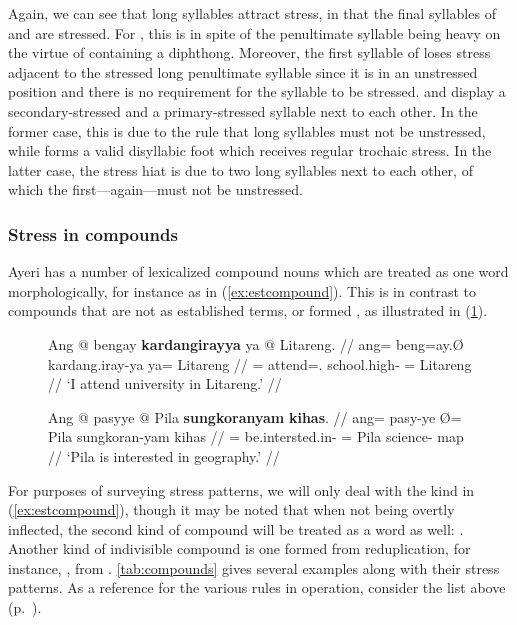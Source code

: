 Again, we can see that long syllables attract stress, in that the final
syllables of  and  are
stressed. For , this is in spite of the penultimate
syllable being heavy on the virtue of containing a diphthong. Moreover, the
first syllable of  loses stress adjacent to the
stressed long penultimate syllable since it is in an unstressed position and
there is no requirement for the syllable to be stressed. 
and  display a secondary-stressed and a
primary-stressed syllable next to each other. In the former case, this is due
to the rule that long syllables must not be unstressed, while 
forms a valid disyllabic foot which receives regular trochaic stress. In the
latter case, the stress hiat is due to two long syllables next to each other,
of which the first---again---must not be unstressed.


\subsubsection{Stress in compounds}

Ayeri has a number of lexicalized compound nouns which are treated
as one word morphologically, for instance as in (\ref{ex:estcompound}). This is
in contrast to compounds that are not as established terms, or formed , as illustrated in (\ref{ex:adhoccompound}).

\begin{figure}[h]
\pex
\a\label{ex:estcompound}\begingl
	\gla Ang @ bengay \textbf{kardangirayya} ya @ Litareng. //
	\glb ang= beng=ay.Ø kardang.iray-ya ya= Litareng //
	\glc \AgtT{}= attend=\Fsg{}.\Top{} school.high-\Loc{} \Loc{}= Litareng //
	\glft `I attend university in Litareng.' //
\endgl

\a\label{ex:adhoccompound}\begingl
	\gla Ang @ pasyye {} @ Pila \textbf{sungkoranyam} \textbf{kihas}. //
	\glb ang= pasy-ye Ø= Pila sungkoran-yam kihas //
	\glc \AgtT{}= be.intersted.in-\TsgF{} \Top{}= Pila science-\Dat{} map //
	\glft `Pila is interested in geography.' //
\endgl
\xe
\end{figure}

For purposes of surveying stress patterns, we will only deal with the kind in 
(\ref{ex:estcompound}), though it may be noted that when not being overtly 
inflected, the second kind of compound will be treated as a word as well:
. Another kind of indivisible 
compound is one formed from reduplication, for instance,
, from .
\autoref{tab:compounds} gives several examples along with their stress
patterns. As a reference for the various rules in operation, consider the list
above (p.~\pageref{2sylsumm}).

